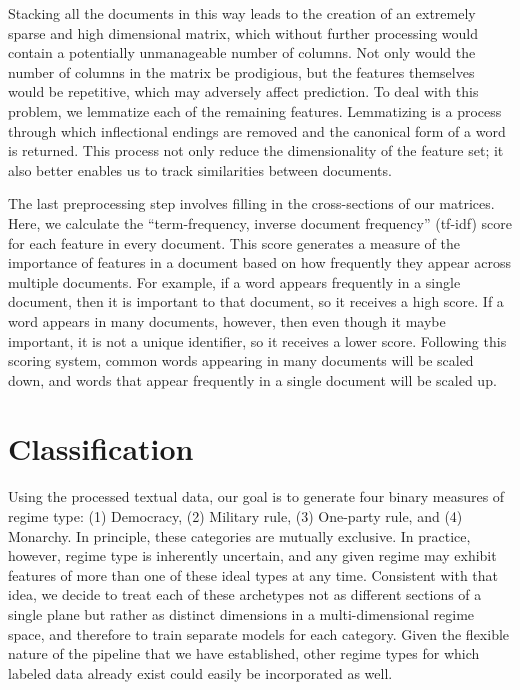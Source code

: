 \documentclass[pdftex,12pt,fullpage,oneside]{amsart}
\begin{document}
Stacking all the documents in this way leads to the creation of an extremely sparse and high dimensional matrix, which without further processing would contain a potentially unmanageable number of columns. Not only would the number of columns in the matrix be prodigious, but the features themselves would be repetitive, which may adversely affect prediction. To deal with this problem, we lemmatize each of the remaining features. Lemmatizing is a process through which inflectional endings are removed and the canonical form of a word is returned. This process not only reduce the dimensionality of the feature set; it also better enables us to track similarities between documents. 

The last preprocessing step involves filling in the cross-sections of our matrices. Here, we calculate the ``term-frequency, inverse document frequency'' (tf-idf) score for each feature in every document. This score generates a measure of the importance of features in a document based on how frequently they appear across multiple documents. For example, if a word appears frequently in a single document, then it is important to that document, so it receives a high score. If a word appears in many documents, however, then even though it maybe important, it is not a unique identifier, so it receives a lower score. Following this scoring system, common words appearing in many documents will be scaled down, and words that appear frequently in a single document will be scaled up.

\section{Classification}

Using the processed textual data, our goal is to generate four binary measures of regime type: (1) Democracy, (2) Military rule, (3) One-party rule, and (4) Monarchy. In principle, these categories are mutually exclusive. In practice, however, regime type is inherently uncertain, and any given regime may exhibit features of more than one of these ideal types at any time. Consistent with that idea, we decide to treat each of these archetypes not as different sections of a single plane but rather as distinct dimensions in a multi-dimensional regime space, and therefore to train separate models for each category. Given the flexible nature of the pipeline that we have established, other regime types for which labeled data already exist could easily be incorporated as well.
\end{document}
